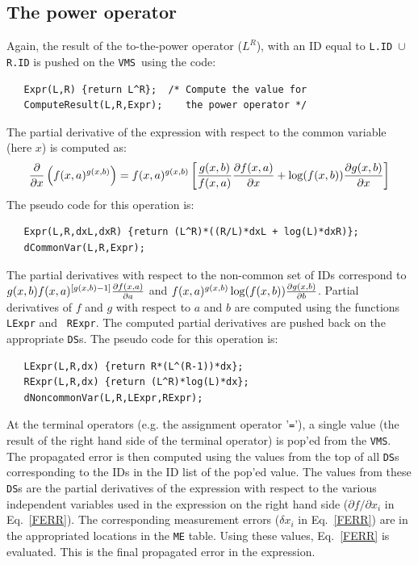 \documentclass[12pt]{article}
\newcommand{\DS}{{\tt DS}}
\newcommand{\VMS}{{\tt VMS}}
\begin{document}
%
%
\subsection{The power operator}

Again, the result of the to-the-power operator ($L^R$), with an ID
equal to {\tt L.ID $\cup$ R.ID} is pushed on the \VMS\ using the code:
\begin{verbatim}
   Expr(L,R) {return L^R};  /* Compute the value for 
   ComputeResult(L,R,Expr);    the power operator */
\end{verbatim}
The partial derivative of the expression with respect to the common
variable (here $x$) is computed as:
\begin{equation}
{\partial \over {\partial
x}}\left(f(x,a)^{g(x,b)}\right)=f(x,a)^{g(x,b)} \left[{g(x,b) \over
f(x,a)} {\partial f(x,a)  \over \partial x} + \log(f(x,b)) 
{\partial g(x,b) \over \partial x} \right] 
\end{equation}
The pseudo code for this operation is:
\begin{verbatim}
   Expr(L,R,dxL,dxR) {return (L^R)*((R/L)*dxL + log(L)*dxR)};
   dCommonVar(L,R,Expr);
\end{verbatim}
The partial derivatives with respect to the non-common set of IDs
correspond to $g(x,b)f(x,a)^{[g(x,b)-1]} {\partial f(x,a) \over
{\partial a}}$ and $f(x,a)^{g(x,b)} \log(f(x,b)) {\partial g(x,b)
\over \partial b}$.  Partial derivatives of $f$ and $g$ with respect
to $a$ and $b$ are computed using the functions {\tt LExpr} and {\tt
RExpr}.  The computed partial derivatives are pushed back on the
appropriate \DS s.  The pseudo code for this operation is:
\begin{verbatim}
   LExpr(L,R,dx) {return R*(L^(R-1))*dx};
   RExpr(L,R,dx) {return (L^R)*log(L)*dx};
   dNoncommonVar(L,R,LExpr,RExpr);
\end{verbatim}
At the terminal operators (e.g. the assignment operator '{\tt =}'), a
single value (the result of the right hand side of the terminal
operator) is pop'ed from the \VMS.  The propagated error is then
computed using the values from the top of all {\tt DS}s corresponding
to the IDs in the ID list of the pop'ed value.  The values from these
\DS s are the partial derivatives of the expression with respect
to the various independent variables used in the expression on the
right hand side ($\partial f / \partial x_i$ in Eq.~\ref{FERR}).  The
corresponding measurement errors ($\delta x_i$ in Eq.~\ref{FERR}) are
in the appropriated locations in the {\tt ME} table.  Using these
values, Eq.~\ref{FERR} is evaluated.  This is the final propagated
error in the expression.
\end{document}
